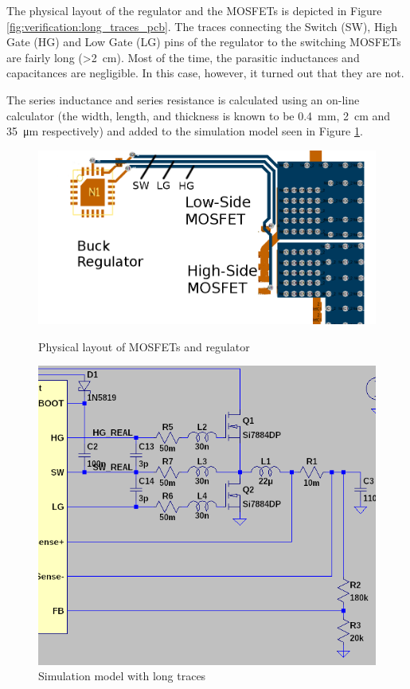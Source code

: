 The physical  layout of the  regulator and the  MOSFETs is depicted  in Figure
\ref{fig:verification:long_traces_pcb}.   The  traces  connecting  the  Switch
(SW), High Gate (HG) and Low Gate  (LG) pins of the regulator to the switching
MOSFETs  are  fairly  long  (>\SI{2}{\centi\metre}). Most  of  the  time,  the
parasitic inductances and capacitances  are negligible. In this case, however,
it turned out that they are not.

The series  inductance  and  series  resistance  is  calculated using an on-line
calculator\cite{ref:trace_inductance}\cite{ref:trace_resistance}   (the   width,
length,    and    thickness    is    known   to    be    \SI{0.4}{\milli\metre},
\SI{2}{\centi\metre}  and \SI{35}{\micro\metre} respectively) and added  to  the
simulation   model  seen  in  Figure   \ref{fig:verification:long_traces_model}.

\begin{figure}[th!]
    \centering
    \begin{minipage}{.6\textwidth}
        \centering
        \includegraphics[width=.9\textwidth]{images/pcb/long-traces.png}
        \caption{Physical layout of MOSFETs and regulator}
        \label{fig:verification:long_traces_pcb}
    \end{minipage}
    \begin{minipage}{.38\textwidth}
        \centering
        \includegraphics[width=.9\textwidth]{images/sim/lt3741-transients-circuit-real.png}
        \caption{Simulation model with long traces}
        \label{fig:verification:long_traces_model}
    \end{minipage}
\end{figure}

